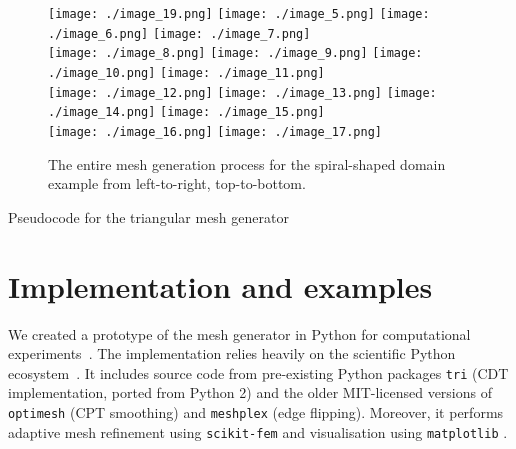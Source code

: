\documentclass[11pt]{article}
\begin{document}
\begin{figure}[htbp]
  \centering
  \texttt{[image: ./image\_19.png]}
  \texttt{[image: ./image\_5.png]}
  \texttt{[image: ./image\_6.png]}
  \texttt{[image: ./image\_7.png]}\\
  \texttt{[image: ./image\_8.png]}
  \texttt{[image: ./image\_9.png]}
  \texttt{[image: ./image\_10.png]}
  \texttt{[image: ./image\_11.png]}\\
  \texttt{[image: ./image\_12.png]}
  \texttt{[image: ./image\_13.png]}
  \texttt{[image: ./image\_14.png]}
  \texttt{[image: ./image\_15.png]}\\
  \texttt{[image: ./image\_16.png]}
  \texttt{[image: ./image\_17.png]}
  \hspace{0.48\textwidth}
  \caption{The entire mesh generation process for the spiral-shaped domain
    example from left-to-right, top-to-bottom.}
\label{fig:spiralexample}
\end{figure}

\begin{algorithm}[H]
  \caption{Pseudocode for the triangular mesh generator}
  \label{alg:meshgen}
  \begin{algorithmic}[1]
    \Statex
    \EndFor
    \State {}
    \EndFunction
  \end{algorithmic}
\end{algorithm}


\section{Implementation and examples}

We created a prototype of the mesh generator in Python for computational
experiments~\cite{adaptmesh2020}.  The implementation relies heavily on the
scientific Python ecosystem~\cite{virtanen2020scipy}.  It includes source code
from pre-existing Python packages \verb|tri| \cite{tri} (CDT implementation,
ported from Python 2) and the older MIT-licensed versions of \verb|optimesh|
\cite{optimesh} (CPT smoothing) and \verb|meshplex| \cite{meshplex} (edge
flipping).  Moreover, it performs adaptive mesh refinement using
\verb|scikit-fem| \cite{gustafsson2020scikit} and visualisation using
\verb|matplotlib| \cite{hunter2007matplotlib}.
\end{document}
